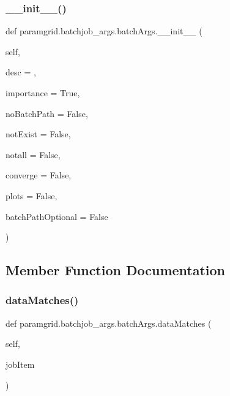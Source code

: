 \subsubsection{\texorpdfstring{\+\_\+\+\_\+init\+\_\+\+\_\+()}{\_\_init\_\_()}}
{\footnotesize\ttfamily def paramgrid.\+batchjob\+\_\+args.\+batch\+Args.\+\_\+\+\_\+init\+\_\+\+\_\+ (\begin{DoxyParamCaption}\item[{}]{self,  }\item[{}]{desc = {\ttfamily \textquotesingle{}\textquotesingle{}},  }\item[{}]{importance = {\ttfamily True},  }\item[{}]{no\+Batch\+Path = {\ttfamily False},  }\item[{}]{not\+Exist = {\ttfamily False},  }\item[{}]{notall = {\ttfamily False},  }\item[{}]{converge = {\ttfamily False},  }\item[{}]{plots = {\ttfamily False},  }\item[{}]{batch\+Path\+Optional = {\ttfamily False} }\end{DoxyParamCaption})}



\subsection{Member Function Documentation}
\mbox{\label{classparamgrid_1_1batchjob__args_1_1batchArgs_a2837820592cdee214b7afc3dfd2a2b13}} 
\subsubsection{\texorpdfstring{data\+Matches()}{dataMatches()}}
{\footnotesize\ttfamily def paramgrid.\+batchjob\+\_\+args.\+batch\+Args.\+data\+Matches (\begin{DoxyParamCaption}\item[{}]{self,  }\item[{}]{job\+Item }\end{DoxyParamCaption})}



